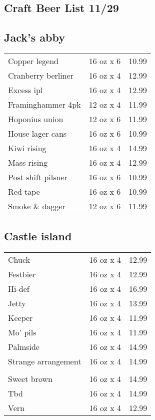 \documentclass{article}%
\begin{document}
%
\pagestyle{empty}%
\normalsize%
%
\setlength{\columnseprule}{0.5pt}%
\setlength{\columnsep}{1cm}%
\renewcommand{\familydefault}{\sfdefault}%
\sffamily%
\begin{multicols}{3}%
\section*{\selectfont Craft Beer List 11/29}%

%
\subsection*{Jack's abby}%
\begin{tabular}{l c r}%
Copper legend&16 oz x 6&10.99\\%
Cranberry berliner&16 oz x 4&12.99\\%
Excess ipl&16 oz x 4&12.99\\%
Framinghammer 4pk&12 oz x 4&11.99\\%
Hoponius union&12 oz x 6&11.99\\%
House lager cans&16 oz x 6&10.99\\%
Kiwi rising&16 oz x 4&14.99\\%
Mass rising&16 oz x 4&12.99\\%
Post shift pilsner&16 oz x 6&10.99\\%
Red tape&16 oz x 6&10.99\\%
Smoke \& dagger&12 oz x 6&11.99\\%
\end{tabular}

%
\subsection*{Castle island}%
\begin{tabular}{l c r}%
Chuck&16 oz x 4&12.99\\%
Festbier&16 oz x 4&12.99\\%
Hi{-}def&16 oz x 4&16.99\\%
Jetty&16 oz x 4&13.99\\%
Keeper&16 oz x 4&11.99\\%
Mo' pils&16 oz x 4&11.99\\%
Palmside&16 oz x 4&14.99\\%
\multirow{1}{15ex}{Strange arrangement}&16 oz x 4&14.99\\%
&&\\%
Sweet brown&16 oz x 4&14.99\\%
Tbd&16 oz x 4&14.99\\%
Vern&16 oz x 4&12.99\\%
\end{tabular}


\end{multicols}
\end{document}
